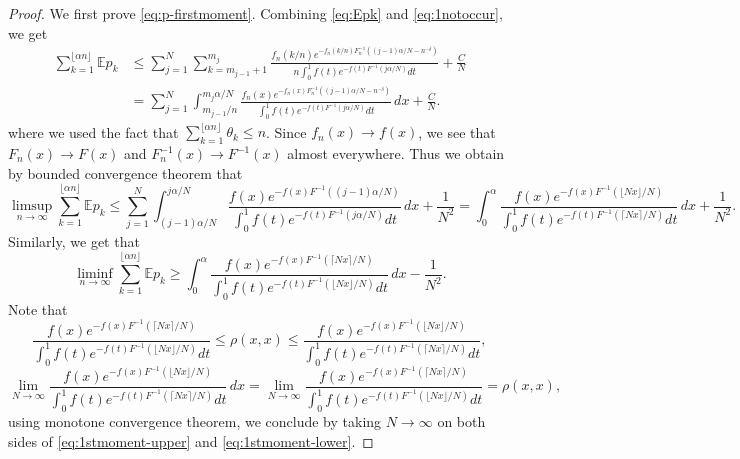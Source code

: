 \documentclass[10pt]{article}
\numberwithin{equation}{section}
\begin{document}
\begin{proof}
        We first prove \eqref{eq:p-firstmoment}. Combining \eqref{eq:Epk} and \eqref{eq:1notoccur}, we get
        \begin{align}
            \sum_{k=1}^{\lfloor \alpha n \rfloor} \mathbb Ep_k 
            & \leq \sum_{j=1}^N \sum_{k=m_{j-1}+1}^{m_j} \frac{f_n(k/n)e^{-f_n(k/n) F_n^{-1}((j-1)\alpha/N-n^{-\delta})}}{n\int_0^1f(t)e^{-f(t)F^{-1}(j\alpha/N)}dt} + \frac{C}{N}\\
            &=\sum_{j=1}^N  \int_{m_{j-1}/n}^{m_j\alpha/N} \frac{f_n(x)e^{-f_n(x) F_n^{-1}((j-1)\alpha/N-n^{-\delta})}}{\int_0^1f(t)e^{-f(t)F^{-1}(j\alpha/N)}dt} \, dx + \frac{C}{N}.
        \end{align}
        where we used the fact that $\sum_{k=1}^{\lfloor \alpha n \rfloor}\theta_k\le n$.
        Since $f_n(x)\to f(x)$, we see that $F_n(x)\to F(x)$ and $F_n^{-1}(x)\to F^{-1}(x)$ almost everywhere. Thus we obtain by bounded convergence theorem that
        \begin{equation}\label{eq:1stmoment-upper}
            \limsup_{n\to \infty} \sum_{k=1}^{\lfloor \alpha n \rfloor} \mathbb Ep_k 
            \leq \sum_{j=1}^N  \int_{(j-1)\alpha/N}^{j\alpha/N} \frac{f(x)e^{-f(x) F^{-1}((j-1)\alpha/N)}}{\int_0^1f(t)e^{-f(t)F^{-1}(j\alpha/N)}dt} \, dx + \frac{1}{N^2} = \int_0^\alpha \frac{f(x)e^{-f(x)F^{-1}(\lfloor Nx\rfloor/N)}}{\int_0^1f(t)e^{-f(t)F^{-1}(\lceil Nx\rceil/N)}dt} \,dx +\frac{1}{N^2}.
        \end{equation}
        Similarly, we get that
        \begin{equation}\label{eq:1stmoment-lower}
            \liminf_{n\to \infty} \sum_{k=1}^{\lfloor \alpha n \rfloor} \mathbb Ep_k 
            \geq \int_0^\alpha \frac{f(x)e^{-f(x)F^{-1}(\lceil Nx\rceil/N)}}{\int_0^1f(t)e^{-f(t)F^{-1}(\lfloor Nx\rfloor/N)}dt} \,dx -\frac{1}{N^2}.
        \end{equation}
        Note that 
        \begin{equation}
            \frac{f(x)e^{-f(x)F^{-1}(\lceil Nx\rceil/N)}}{\int_0^1f(t)e^{-f(t)F^{-1}(\lfloor Nx\rfloor/N)}dt} \leq \rho (x,x) \leq \frac{f(x)e^{-f(x)F^{-1}(\lfloor Nx\rfloor/N)}}{\int_0^1f(t)e^{-f(t)F^{-1}(\lceil Nx\rceil/N)}dt},
        \end{equation}
        \begin{equation}
            \lim_{N\to \infty} \frac{f(x)e^{-f(x)F^{-1}(\lfloor Nx\rfloor/N)}}{\int_0^1f(t)e^{-f(t)F^{-1}(\lceil Nx\rceil/N)}dt} \,dx = \lim_{N\to \infty}\frac{f(x)e^{-f(x)F^{-1}(\lceil Nx\rceil/N)}}{\int_0^1f(t)e^{-f(t)F^{-1}(\lfloor Nx\rfloor/N)}dt} =\rho(x,x),
        \end{equation}
        using monotone convergence theorem, we conclude by taking $N\to \infty $ on both sides of \eqref{eq:1stmoment-upper} and \eqref{eq:1stmoment-lower}.


\end{proof}
\end{document}
